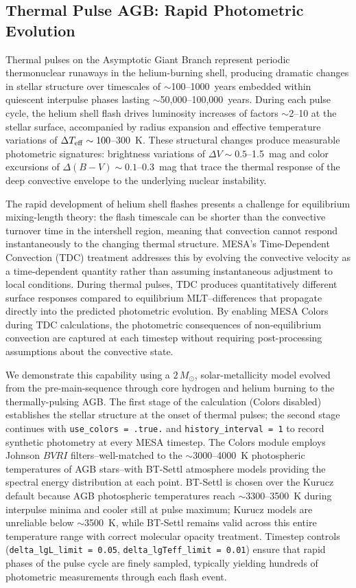 \documentclass[linenumbers,apj,twocolumn, floatfix]{aastex701} \usepackage{amsmath} \usepackage{longtable} \usepackage{graphicx} \usepackage{ulem} \usepackage{xcolor} \usepackage{lettrine} \usepackage{yfonts} \usepackage{rotating}
\begin{document}
\subsection{Thermal Pulse AGB: Rapid Photometric Evolution}
\label{sec:demo_tp_agb}

Thermal pulses on the Asymptotic Giant Branch represent periodic thermonuclear runaways in the helium-burning shell, producing dramatic changes in stellar structure over timescales of $\sim$100--1000~years embedded within quiescent interpulse phases lasting $\sim$50,000--100,000~years.
During each pulse cycle, the helium shell flash drives luminosity increases of factors $\sim$2--10 at the stellar surface, accompanied by radius expansion and effective temperature variations of $\Delta T_{\rm eff} \sim 100$--300~K.
These structural changes produce measurable photometric signatures: brightness variations of $\Delta V \sim 0.5$--1.5~mag and color excursions of $\Delta(B-V) \sim 0.1$--0.3~mag that trace the thermal response of the deep convective envelope to the underlying nuclear instability.

The rapid development of helium shell flashes presents a challenge for equilibrium mixing-length theory: the flash timescale can be shorter than the convective turnover time in the intershell region, meaning that convection cannot respond instantaneously to the changing thermal structure.
MESA's Time-Dependent Convection (TDC) treatment \citep{MESAV} addresses this by evolving the convective velocity as a time-dependent quantity rather than assuming instantaneous adjustment to local conditions.
During thermal pulses, TDC produces quantitatively different surface responses compared to equilibrium MLT--differences that propagate directly into the predicted photometric evolution.
By enabling MESA Colors during TDC calculations, the photometric consequences of non-equilibrium convection are captured at each timestep without requiring post-processing assumptions about the convective state.

We demonstrate this capability using a $2\,M_\odot$, solar-metallicity model evolved from the pre-main-sequence through core hydrogen and helium burning to the thermally-pulsing AGB.
The first stage of the calculation (Colors disabled) establishes the stellar structure at the onset of thermal pulses; the second stage continues with \texttt{use\_colors = .true.} and \texttt{history\_interval = 1} to record synthetic photometry at every MESA timestep.
The Colors module employs Johnson $BVRI$ filters--well-matched to the $\sim$3000--4000~K photospheric temperatures of AGB stars--with BT-Settl atmosphere models providing the spectral energy distribution at each point.
BT-Settl is chosen over the Kurucz default because AGB photospheric temperatures reach $\sim$3300--3500~K during interpulse minima and cooler still at pulse maximum; Kurucz models are unreliable below $\sim$3500~K, while BT-Settl remains valid across this entire temperature range with correct molecular opacity treatment.
Timestep controls (\texttt{delta\_lgL\_limit = 0.05}, \texttt{delta\_lgTeff\_limit = 0.01}) ensure that rapid phases of the pulse cycle are finely sampled, typically yielding hundreds of photometric measurements through each flash event.
\end{document}

